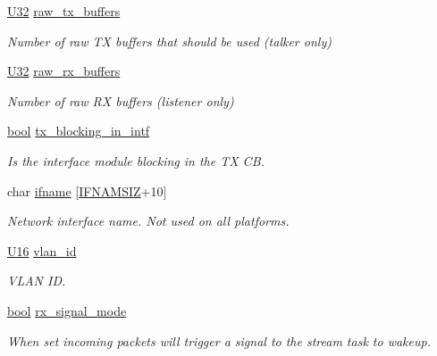 \begin{DoxyCompactItemize}
\hyperlink{openavb__types__base__pub_8h_a696390429f2f3b644bde8d0322a24124}{U32} \hyperlink{structopenavb__tl__cfg__t_add91cb46547dd8e10a83b4807314b515}{raw\+\_\+tx\+\_\+buffers}
\begin{DoxyCompactList}\small\item\em Number of raw TX buffers that should be used (talker only) \end{DoxyCompactList}\item 
\hyperlink{openavb__types__base__pub_8h_a696390429f2f3b644bde8d0322a24124}{U32} \hyperlink{structopenavb__tl__cfg__t_a878cfe34b25df40f0858bff76cbfd4e6}{raw\+\_\+rx\+\_\+buffers}
\begin{DoxyCompactList}\small\item\em Number of raw RX buffers (listener only) \end{DoxyCompactList}\item 
\hyperlink{avb__gptp_8h_af6a258d8f3ee5206d682d799316314b1}{bool} \hyperlink{structopenavb__tl__cfg__t_aeb3581dc6183af28e4c61830959f6c86}{tx\+\_\+blocking\+\_\+in\+\_\+intf}
\begin{DoxyCompactList}\small\item\em Is the interface module blocking in the TX CB. \end{DoxyCompactList}\item 
char \hyperlink{structopenavb__tl__cfg__t_a6a7c2523839aee5440af6ea2c11d8c02}{ifname} \mbox{[}\hyperlink{tl_2openavb__tl__pub_8h_acd06da230a96d3b7e6f193c5b3142002}{I\+F\+N\+A\+M\+S\+IZ}+10\mbox{]}
\begin{DoxyCompactList}\small\item\em Network interface name. Not used on all platforms. \end{DoxyCompactList}\item 
\hyperlink{openavb__types__base__pub_8h_a0a0a322d5fa4a546d293a77ba8b4a71f}{U16} \hyperlink{structopenavb__tl__cfg__t_a1b24465e054a200402c04340ccc56eae}{vlan\+\_\+id}
\begin{DoxyCompactList}\small\item\em V\+L\+AN ID. \end{DoxyCompactList}\item 
\hyperlink{avb__gptp_8h_af6a258d8f3ee5206d682d799316314b1}{bool} \hyperlink{structopenavb__tl__cfg__t_a580a82350a4c45004177344444bd25c5}{rx\+\_\+signal\+\_\+mode}
\begin{DoxyCompactList}\small\item\em When set incoming packets will trigger a signal to the stream task to wakeup. \end{DoxyCompactList}\item 

\end{DoxyCompactItemize}
